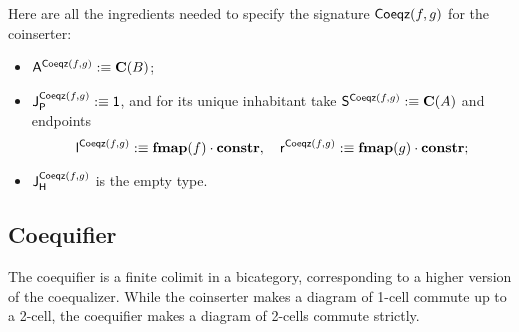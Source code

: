 Here are all the ingredients needed to specify the signature $\coequalizer f g$ for the coinserter:
\begin{itemize}
\item $\pointconstr[\coequalizer f g] \eqdef \constantP{B}$;
\item $\pathlabel[\coequalizer f g] \eqdef \unit$, and for its unique inhabitant take $\patharg[\coequalizer f g] \eqdef \constantP{A}$ and endpoints
  \[
  \pathleft[\coequalizer f g] \eqdef \comp{\fmap(f)}{\constr}, \quad
  \pathright[\coequalizer f g] \eqdef \comp{\fmap(g)}{\constr}; 
  \]
\item $\homotlabel[\coequalizer f g]$ is the empty type.
\end{itemize}




\subsection{Coequifier}
\label{sec:coequifier}

The coequifier is a finite colimit in a bicategory, corresponding to a
higher version of the coequalizer.
While the coinserter makes a diagram of 1-cell commute up to a 2-cell,
the coequifier makes a diagram of 2-cells commute strictly.

